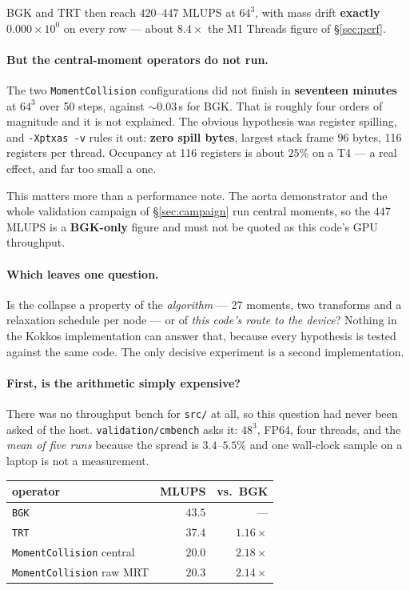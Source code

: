 \documentclass[11pt,a4paper]{article}
\newcommand{\code}[1]{\texttt{\small #1}}
\newcommand{\e}[1]{\times 10^{#1}}
\begin{document}
\noindent BGK and TRT then reach $420$--$447$ MLUPS at $64^3$, with mass drift
\textbf{exactly $0.000\e{0}$} on every row --- about $8.4\times$ the M1 Threads
figure of \S\ref{sec:perf}.

\paragraph{But the central-moment operators do not run.} The two
\code{MomentCollision} configurations did not finish in \textbf{seventeen
minutes} at $64^3$ over 50 steps, against $\sim0.03$\,s for BGK. That is roughly
four orders of magnitude and it is not explained. The obvious hypothesis was
register spilling, and \code{-Xptxas -v} rules it out: \textbf{zero spill bytes},
largest stack frame 96 bytes, 116 registers per thread. Occupancy at 116
registers is about $25\%$ on a T4 --- a real effect, and far too small a one.

This matters more than a performance note. The aorta demonstrator and the whole
validation campaign of \S\ref{sec:campaign} run central moments, so the $447$
MLUPS is a \textbf{BGK-only} figure and must not be quoted as this code's GPU
throughput.

\paragraph{Which leaves one question.} Is the collapse a property of the
\emph{algorithm} --- 27 moments, two transforms and a relaxation schedule per
node --- or of \emph{this code's route to the device}? Nothing in the Kokkos
implementation can answer that, because every hypothesis is tested against the
same code. The only decisive experiment is a second implementation.

\paragraph{First, is the arithmetic simply expensive?}
\label{sec:cmbench}
There was no throughput bench for \code{src/} at all, so this question had never
been asked of the host. \code{validation/cmbench} asks it: $48^3$, FP64, four
threads, and the \emph{mean of five runs} because the spread is $3.4$--$5.5\%$
and one wall-clock sample on a laptop is not a measurement.

\begin{center}\small
\begin{tabular}{lrr}
\toprule
operator & MLUPS & vs.\ BGK \\
\midrule
\code{BGK}                     & $43.5$ & --- \\
\code{TRT}                     & $37.4$ & $1.16\times$ \\
\code{MomentCollision} central & $20.0$ & $2.18\times$ \\
\code{MomentCollision} raw MRT & $20.3$ & $2.14\times$ \\
\bottomrule
\end{tabular}
\end{center}
\end{document}
